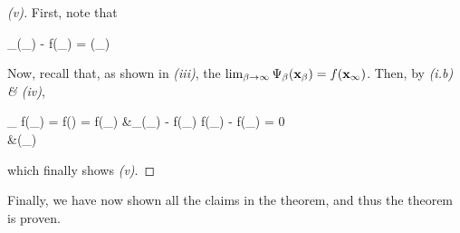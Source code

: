 \begin{proof}[(v)]

First, note that 
\begin{frml}
	\Psi_\beta(\vx_\beta) - f(\vx_\beta) = \beta * \alpha(\vx_\beta)
\end{frml}
Now, recall that, as shown in \textit{(iii)},
the $\lim_{\beta \rightarrow \infty} \Psi_\beta(\mathbf{x}_\beta) = f(\mathbf{x}_\infty)$.
Then, by \textit{(i.b) \& (iv)}, 
\begin{frml}
	\lim_{\beta \rightarrow \infty} f(\vx_\beta) = f(\bx) = f(\vx_\infty)
	&\implies \Psi_\beta(\vx_\beta) - f(\vx_\beta) \rightarrow f(\vx_\infty) - f(\vx_\infty) = 0  \beta \rightarrow \infty \\
	&\implies \beta * \alpha(\vx_\beta)   \beta \rightarrow \infty
\end{frml}
which finally shows \textit{(v)}.
\end{proof}

Finally, we have now shown all the claims in the theorem, and thus the theorem
is proven.
